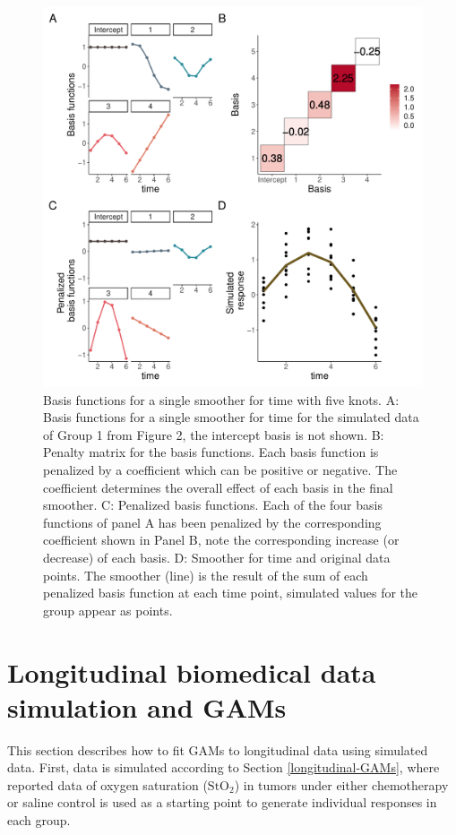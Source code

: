 \documentclass[
]{article}
\begin{document}
\begin{figure}[H]

{\centering \includegraphics[width=0.75\linewidth,]{Full_document_files/figure-latex/basis-plot-appendix-1} 

}

\caption{Basis functions for a single smoother for time with five knots. A: Basis functions for a single smoother for time for the simulated data of Group 1 from Figure 2, the intercept basis is not shown. B: Penalty matrix for the basis functions. Each basis function is penalized by a coefficient which can be positive or negative. The coefficient determines the overall effect of each basis in the final smoother. C: Penalized basis functions. Each of the four basis functions of panel A has been penalized by the corresponding coefficient shown in Panel B, note the corresponding increase (or decrease) of each basis. D: Smoother for time and original data points. The smoother (line) is the result of the sum of each penalized basis function at each time point, simulated values for the group appear as points.}\label{fig:basis-plot-appendix}
\end{figure}

\hypertarget{tumor-data-simulation}{%
\section{Longitudinal biomedical data simulation and GAMs}\label{tumor-data-simulation}}

This section describes how to fit GAMs to longitudinal data using simulated data. First, data is simulated according to Section \ref{longitudinal-GAMs}, where reported data of oxygen saturation (\(\mbox{StO}_2\)) in tumors under either chemotherapy or saline control is used as a starting point to generate individual responses in each group.
\end{document}
